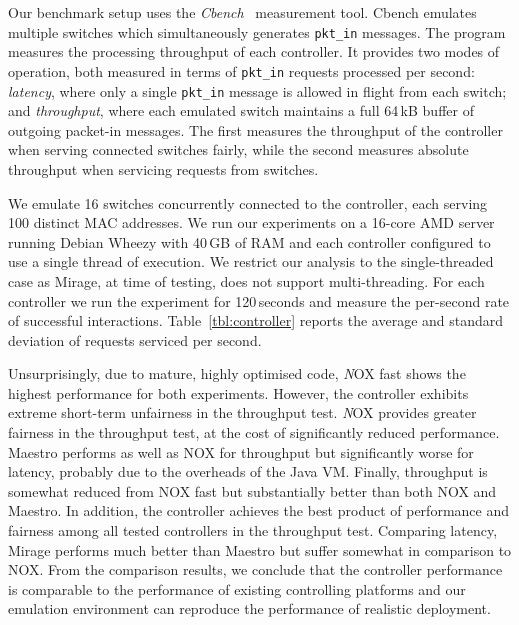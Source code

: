 Our benchmark setup uses the {\it Cbench}~\cite{cbench} measurement tool. Cbench
emulates multiple switches which simultaneously generates {\tt pkt\_in} messages.
The program measures the processing throughput of each controller.
It provides two modes of operation, both measured in terms of {\tt pkt\_in}
requests processed per second: {\it latency}, where only a single
{\tt pkt\_in} message is allowed in flight from each switch; and
{\it throughput}, where each emulated switch maintains a full 64\,kB buffer of outgoing
packet-in messages. The first measures the throughput of the controller when
serving connected switches fairly, while the second measures absolute throughput
when servicing requests from switches.
                                                                       
We emulate 16 switches concurrently connected to the controller, each serving
100 distinct MAC addresses. We run our experiments on a 16-core AMD server
running Debian Wheezy with 40\,GB of RAM and each controller configured to use a
single thread of execution. We restrict our analysis to the single-threaded case
as Mirage, at time of testing, does not support multi-threading. For each
controller we run the experiment for 120\,seconds and measure the per-second
rate of successful interactions. Table~\ref{tbl:controller} reports the average
and standard deviation of requests serviced per second.

Unsurprisingly, due to mature, highly optimised code, {\emph NOX fast} shows the
highest performance for both experiments. However, the controller exhibits
extreme short-term unfairness in the throughput test.  {\emph NOX} provides
greater fairness in the throughput test, at the cost of significantly reduced
performance. Maestro performs as well as NOX for throughput but significantly
worse for latency, probably due to the overheads of the Java VM\@.  Finally,
\mirage throughput is somewhat reduced from NOX fast but substantially better
than both NOX and Maestro. In addition, the \mirage controller achieves the best
product of performance and fairness among all tested controllers in the
throughput test.  Comparing latency, Mirage performs much better than Maestro
but suffer somewhat in comparison to NOX\@. From the comparison results, we
conclude that the \mirage controller performance is comparable to the performance of
existing controlling platforms and our emulation environment can reproduce
the performance of realistic \of deployment. 

